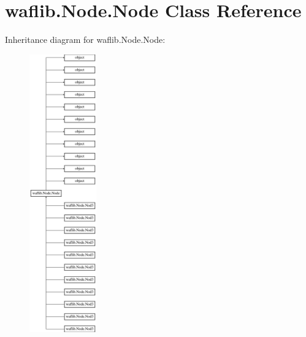 \hypertarget{classwaflib_1_1_node_1_1_node}{}\section{waflib.\+Node.\+Node Class Reference}
\label{classwaflib_1_1_node_1_1_node}
Inheritance diagram for waflib.\+Node.\+Node\+:\begin{figure}[H]
\begin{center}
\leavevmode
\includegraphics[height=12.000000cm]{classwaflib_1_1_node_1_1_node}
\end{center}
\end{figure}
